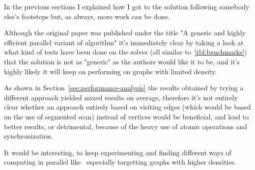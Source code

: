 \documentclass[a4paper,10pt]{article}
\begin{document}
In the previous sections I explained how I got to the solution following somebody else's footsteps but, as always, more work can be done.

Although the original paper was published under the title "A generic and highly efficient parallel variant of \brkas algorithm" it's immediately clear by taking a look at what kind of tests have been done on the solver (all similar to~\ref{tbl:benchmarks}) that the solution is not as "generic" as the authors would like it to be, and it's highly likely it will keep on performing on graphs with limited density.

As shown in Section~\ref{sec:performance-analysis} the results obtained by trying a different
approach yielded mixed results on average, therefore it's not entirely clear whether an approach
entirely based on visiting edges (which would be based on the use of segmented scan) instead of vertices would be beneficial, and lead to better results, or detrimental, because of the heavy use of atomic operations and synchronization.

It would be interesting, to keep experimenting and finding different ways of computing \mst in
parallel like~\cite{mst-bipartite} especially targetting graphs with higher densities.

\clearpage

\printbibliography
\end{document}
